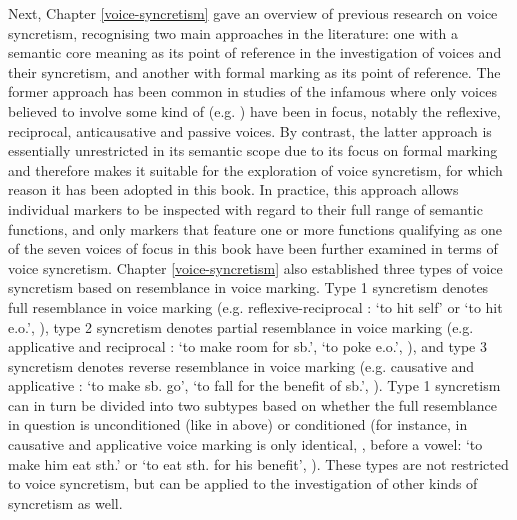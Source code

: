 Next, Chapter \ref{voice-syncretism} gave an overview of previous research on voice syncretism, recognising two main approaches in the literature: one with a semantic core meaning as its point of reference in the investigation of voices and their syncretism, and another with formal marking as its point of reference. The former approach has been common in studies of the infamous  where only voices believed to involve some kind of   (e.g. \citealt{klaiman:1991}) have been in focus, notably the reflexive, reciprocal, anticausative and passive voices. By contrast, the latter approach is essentially unrestricted in its semantic scope due to its focus on formal marking and therefore makes it suitable for the exploration of voice syncretism, for which reason it has been adopted in this book. In practice, this approach allows individual markers to be inspected with regard to their full range of semantic functions, and only markers that feature one or more functions qualifying as one of the seven voices of focus in this book have been further examined in terms of voice syncretism. Chapter \ref{voice-syncretism} also established three types of voice syncretism based on resemblance in voice marking. Type 1 syncretism denotes full resemblance in voice marking (e.g.  reflexive-reciprocal :  ‘to hit self’ or ‘to hit e.o.’, \citealt[214]{green:1995}), type 2 syncretism denotes partial resemblance in voice marking (e.g.  applicative  and reciprocal :  ‘to make room for sb.’,  ‘to poke e.o.’, \citealt[263, 271]{cumberland:2005}), and type 3 syncretism denotes reverse resemblance in voice marking (e.g.  causative  and applicative :  ‘to make sb. go’,  ‘to fall for the benefit of sb.’, \citealt[209, 250, 255]{bruce:1979}). Type 1 syncretism can in turn be divided into two subtypes based on whether the full resemblance in question is unconditioned (like in  above) or conditioned (for instance, in  causative and applicative voice marking is only identical, , before a vowel:  ‘to make him eat sth.’ or ‘to eat sth. for his benefit’, \citealt[189]{steeman:2012}). These types are not restricted to voice syncretism, but can be applied to the investigation of other kinds of syncretism as well.

